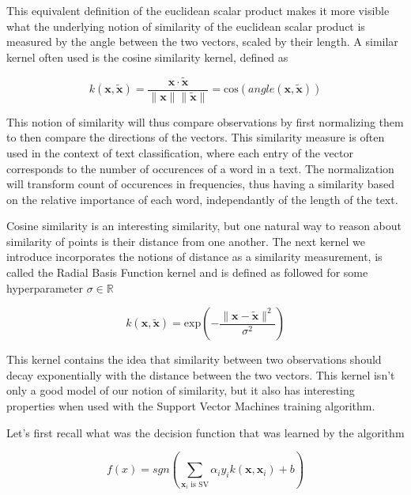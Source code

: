 This equivalent definition of the euclidean scalar product makes it more visible what the underlying notion of similarity of the euclidean scalar product is measured by the angle between the two vectors, scaled by their length. A similar kernel often used is the cosine similarity kernel, defined as

\begin{equation*}
  k(\mathbf{x}, \mathbf{\tilde{x}}) = \frac{\mathbf{x} \cdot \mathbf{\tilde{x}}}{\|\mathbf{x}\|\|\mathbf{\tilde{x}}\|} = \text{cos}\left(angle\left(\mathbf{x}, \mathbf{\tilde{x}}\right)\right)
\end{equation*}

This notion of similarity will thus compare observations by first normalizing them to then compare the directions of the vectors. This similarity measure is often used in the context of text classification, where each entry of the vector corresponds to the number of occurences of a word in a text. The normalization will transform count of occurences in frequencies, thus having a similarity based on the relative importance of each word, independantly of the length of the text.

Cosine similarity is an interesting similarity, but one natural way to reason about similarity of points is their distance from one another. The next kernel we introduce incorporates the notions of distance as a similarity measurement, is called the Radial Basis Function kernel and is defined as followed for some hyperparameter $\sigma \in \mathbb{R}$

\begin{equation*}
  k(\mathbf{x}, \mathbf{\tilde{x}}) = \text{exp}\left(-\frac{\|\mathbf{x} - \mathbf{\tilde{x}}\|^2}{\sigma^2}\right)
\end{equation*}

This kernel contains the idea that similarity between two observations should decay exponentially with the distance between the two vectors. This kernel isn't only a good model of our notion of similarity, but it also has interesting properties when used with the Support Vector Machines training algorithm.

Let's first recall what was the decision function that was learned by the algorithm

\begin{equation*}
  f\left(x\right) = sgn\left(\sum_{\mathbf{x}_i \text{ is SV}}\alpha_iy_ik\left(\mathbf{x}, \mathbf{x}_i\right) + b\right)
\end{equation*}

